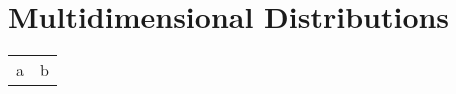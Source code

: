 \section{Multidimensional Distributions}
\renewcommand{\arraystretch}{1.3}
\setlength\tabcolsep{6pt} %
\begin{tabularx}{\linewidth}{XX}
    a & b \\
\end{tabularx}
\renewcommand{\arraystretch}{1}
\setlength\tabcolsep{6pt} %
